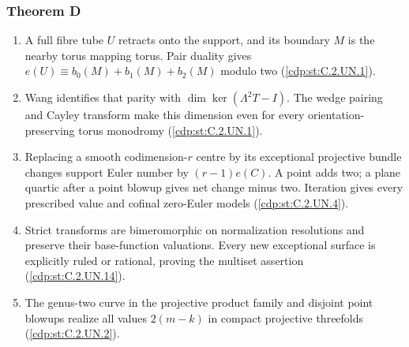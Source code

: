 \hypertarget{outline-II-D}{}
\subsubsection*{Theorem D}
\begin{enumerate}[label=\arabic*.,leftmargin=*]
\item\hypertarget{step-II-D-1}{} A full fibre tube $U$ retracts
onto the support, and its boundary $M$ is the nearby torus mapping
torus. Pair duality gives
$e(U)\equiv b_0(M)+b_1(M)+b_2(M)$ modulo two
(\hyperref[cdp:st:C.2.UN.1]{\ref*{cdp:st:C.2.UN.1}}).
\item\hypertarget{step-II-D-2}{} Wang identifies that parity with
$\dim\ker(\Lambda^2T-I)$. The wedge pairing and Cayley transform
make this dimension even for every orientation-preserving torus
monodromy (\hyperref[cdp:st:C.2.UN.1]{\ref*{cdp:st:C.2.UN.1}}).
\item\hypertarget{step-II-D-3}{} Replacing a smooth codimension-$r$
centre by its exceptional projective bundle changes support Euler
number by $(r-1)e(C)$. A point adds two; a plane quartic after a
point blowup gives net change minus two. Iteration gives every
prescribed value and cofinal zero-Euler models
(\hyperref[cdp:st:C.2.UN.4]{\ref*{cdp:st:C.2.UN.4}}).
\item\hypertarget{step-II-D-4}{} Strict transforms are
bimeromorphic on normalization resolutions and preserve their
base-function valuations. Every new exceptional surface is
explicitly ruled or rational, proving the multiset assertion
(\hyperref[cdp:st:C.2.UN.14]{\ref*{cdp:st:C.2.UN.14}}).
\item\hypertarget{step-II-D-5}{} The genus-two curve in the
projective product family and disjoint point blowups realize all
values $2(m-k)$ in compact projective threefolds
(\hyperref[cdp:st:C.2.UN.2]{\ref*{cdp:st:C.2.UN.2}}).
\end{enumerate}

\hypertarget{outline-II-E}{}
